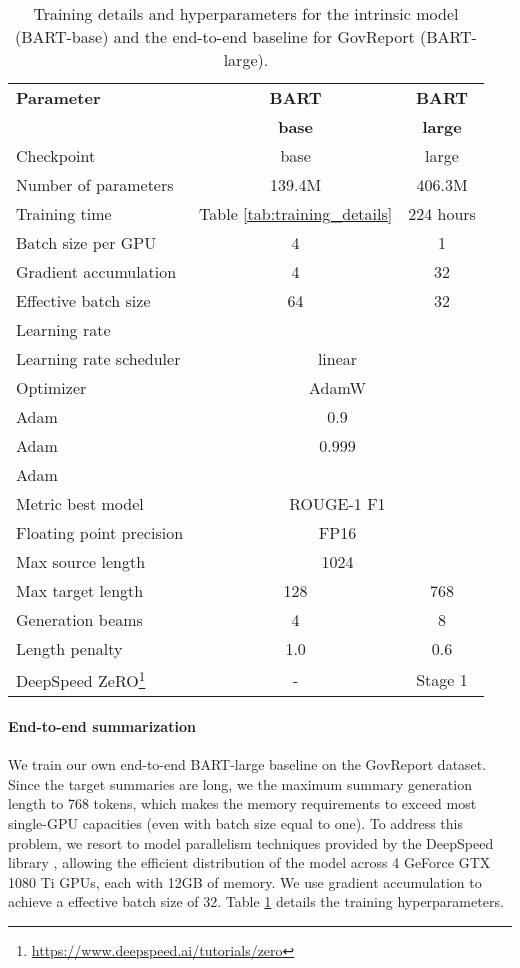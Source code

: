 \documentclass[11pt,table]{article}
\begin{document}
\begin{table}
  \centering
  \setlength\tabcolsep{2.9pt}
  \begin{tabular}{lcc}
    \toprule
    \textbf{Parameter} & \textbf{BART} & \textbf{BART} \\
     & \textbf{base} & \textbf{large} \\
    \midrule
    Checkpoint & base & large \\
    Number of parameters & 139.4M & 406.3M \\
    Training time & Table \ref{tab:training_details} & 224 hours \\
    Batch size per GPU & 4 & 1 \\
    Gradient accumulation & 4 & 32 \\
    Effective batch size & 64 & 32 \\
    Learning rate &  &  \\
    Learning rate scheduler & \multicolumn{2}{c}{linear} \\
    Optimizer & \multicolumn{2}{c}{AdamW} \\
    Adam  & \multicolumn{2}{c}{0.9} \\
    Adam  & \multicolumn{2}{c}{0.999} \\
    Adam  & \multicolumn{2}{c}{} \\
    Metric best model & \multicolumn{2}{c}{ROUGE-1 F1} \\
    Floating point precision & \multicolumn{2}{c}{FP16} \\
    Max source length & \multicolumn{2}{c}{1024} \\
    Max target length & 128 & 768 \\
    Generation beams & 4 & 8 \\
    Length penalty & 1.0 & 0.6 \\  
    DeepSpeed ZeRO\footnote{\url{https://www.deepspeed.ai/tutorials/zero}} & - & Stage 1 \\
    \bottomrule
  \end{tabular}
  \caption{Training details and  hyperparameters for the intrinsic model (BART-base) and the end-to-end baseline for GovReport (BART-large).}
  \label{tab:training_parameters}
\end{table}

\paragraph{End-to-end summarization}
We train our own end-to-end BART-large baseline on the GovReport dataset. Since the target summaries are long, we the maximum summary generation length to 768 tokens, which makes the memory requirements to exceed most single-GPU capacities (even with batch size equal to one). To address this problem, we resort to model parallelism techniques provided by the DeepSpeed library \cite{rajbhandari2019zero}, allowing the efficient distribution of the model across 4 GeForce GTX 1080 Ti GPUs, each with 12GB of memory. We use gradient accumulation to achieve a effective batch size of 32. Table \ref{tab:training_parameters} details the training hyperparameters.
\end{document}
